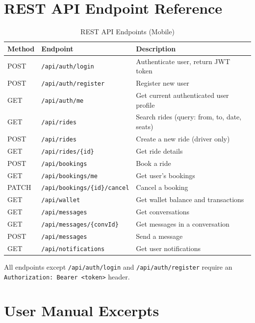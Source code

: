 \documentclass[12pt,a4paper,openright]{report}
\begin{document}
\chapter{REST API Endpoint Reference}
\label{app:api}

\begin{table}[H]
\centering
\caption{REST API Endpoints (Mobile)}
\label{tab:api-endpoints}
\begin{tabularx}{\textwidth}{l l X}
\toprule
\textbf{Method} & \textbf{Endpoint} & \textbf{Description} \\
\midrule
POST & \texttt{/api/auth/login}    & Authenticate user, return JWT token \\
POST & \texttt{/api/auth/register} & Register new user \\
GET  & \texttt{/api/auth/me}       & Get current authenticated user profile \\
GET  & \texttt{/api/rides}         & Search rides (query: from, to, date, seats) \\
POST & \texttt{/api/rides}         & Create a new ride (driver only) \\
GET  & \texttt{/api/rides/\{id\}}  & Get ride details \\
POST & \texttt{/api/bookings}      & Book a ride \\
GET  & \texttt{/api/bookings/me}   & Get user's bookings \\
PATCH & \texttt{/api/bookings/\{id\}/cancel} & Cancel a booking \\
GET  & \texttt{/api/wallet}        & Get wallet balance and transactions \\
GET  & \texttt{/api/messages}      & Get conversations \\
GET  & \texttt{/api/messages/\{convId\}} & Get messages in a conversation \\
POST & \texttt{/api/messages}      & Send a message \\
GET  & \texttt{/api/notifications} & Get user notifications \\
\bottomrule
\end{tabularx}
\end{table}

All endpoints except \texttt{/api/auth/login} and \texttt{/api/auth/register} require an \texttt{Authorization: Bearer <token>} header.

\chapter{User Manual Excerpts}
\label{app:user-manual}
\end{document}

